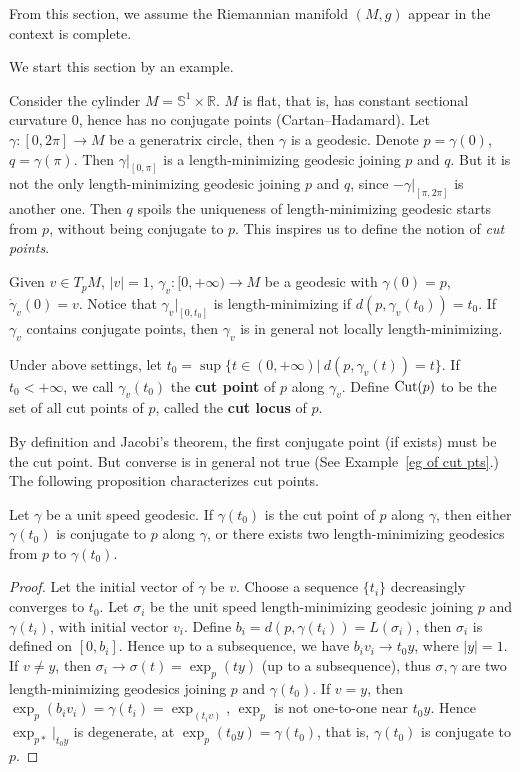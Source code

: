 From this section, we assume the Riemannian manifold $(M,g)$ appear in the context is complete.

We start this section by an example.

\begin{eg}
    Consider the cylinder $M=\mathbb{S}^1\times\mathbb{R}$.
    $M$ is flat, that is, has constant sectional curvature $0$, hence has no conjugate points (Cartan--Hadamard).
    Let $\gamma:[0,2\pi]\to M$ be a generatrix circle, then $\gamma$ is a geodesic.
    Denote $p=\gamma(0)$, $q=\gamma(\pi)$.
    Then $\gamma|_{[0,\pi]}$ is a length-minimizing geodesic joining $p$ and $q$.
    But it is not the only length-minimizing geodesic joining $p$ and $q$, since $-\gamma|_{[\pi,2\pi]}$ is another one.
    Then $q$ spoils the uniqueness of length-minimizing geodesic starts from $p$, without being conjugate to $p$.
    This inspires us to define the notion of \emph{cut points}.
\end{eg}

Given $v\in T_pM$, $|v|=1$, $\gamma_v:[0,+\infty)\to M$ be a geodesic with $\gamma(0)=p$, $\dot{\gamma}_v(0)=v$.
Notice that $\gamma_v|_{[0,t_0]}$ is length-minimizing if $d(p,\gamma_v(t_0))=t_0$.
If $\gamma_v$ contains conjugate points, then $\gamma_v$ is in general not locally length-minimizing.

\begin{defn}
    Under above settings, let $t_0=\sup\{t\in(0,+\infty)|\ d(p,\gamma_v(t))=t\}$.
    If $t_0<+\infty$, we call $\gamma_v(t_0)$ the \textbf{cut point} of $p$ along $\gamma_v$.
    Define $\operatorname{Cut}(p)$ to be the set of all cut points of $p$, called the \textbf{cut locus} of $p$.
\end{defn}

By definition and Jacobi's theorem, the first conjugate point (if exists) must be the cut point.
But converse is in general not true (See Example~\ref{eg of cut pts}.)
The following proposition characterizes cut points.

\begin{prop}
    Let $\gamma$ be a unit speed geodesic.
    If $\gamma(t_0)$ is the cut point of $p$ along $\gamma$, then either $\gamma(t_0)$ is conjugate to $p$ along $\gamma$, or there exists two length-minimizing geodesics from $p$ to $\gamma(t_0)$.
\end{prop}
\begin{proof}
    Let the initial vector of $\gamma$ be $v$.
    Choose a sequence $\{t_i\}$ decreasingly converges to $t_0$.
    Let $\sigma_i$ be the unit speed length-minimizing geodesic joining $p$ and $\gamma(t_i)$, with initial vector $v_i$.
    Define $b_i=d(p,\gamma(t_i))=L(\sigma_i)$, then $\sigma_i$ is defined on $[0,b_i]$.
    Hence up to a subsequence, we have $b_iv_i\to t_0y$, where $|y|=1$.
    If $v\neq y$, then $\sigma_i\to\sigma(t)=\exp_p(ty)$ (up to a subsequence), thus $\sigma,\gamma$ are two length-minimizing geodesics joining $p$ and $\gamma(t_0)$.
    If $v=y$, then $\exp_p(b_iv_i)=\gamma(t_i)=\exp_(t_iv)$, $\exp_p$ is not one-to-one near $t_0y$.
    Hence $\exp_{p*}|_{t_0y}$ is degenerate, at $\exp_p(t_0y)=\gamma(t_0)$, that is, $\gamma(t_0)$ is conjugate to $p$.
\end{proof}

